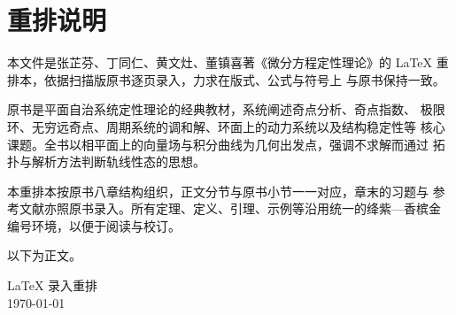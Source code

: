 \documentclass{book}
\begin{document}
\makecover

\frontmatter

\chapter*{重排说明}

本文件是张芷芬、丁同仁、黄文灶、董镇喜著《微分方程定性理论》的
LaTeX 重排本，依据扫描版原书逐页录入，力求在版式、公式与符号上
与原书保持一致。

原书是平面自治系统定性理论的经典教材，系统阐述奇点分析、奇点指数、
极限环、无穷远奇点、周期系统的调和解、环面上的动力系统以及结构稳定性等
核心课题。全书以相平面上的向量场与积分曲线为几何出发点，强调不求解而通过
拓扑与解析方法判断轨线性态的思想。

本重排本按原书八章结构组织，正文分节与原书小节一一对应，章末的习题与
参考文献亦照原书录入。所有定理、定义、引理、示例等沿用统一的绛紫—香槟金
编号环境，以便于阅读与校订。

以下为正文。

\begin{flushright}
	LaTeX 录入重排\\
	\today
\end{flushright}

\tableofcontents
\newpage

\mainmatter
\setcounter{page}{1}


%
%
%
%
%
%
%
%

%

%

%
\end{document}
